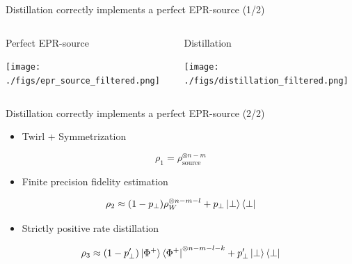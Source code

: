 \documentclass[presentation]{beamer}
\begin{document}
\begin{frame}[label={sec:org179e2c8}]{Distillation correctly implements a perfect EPR-source (1/2)}
\begin{columns}[t]
\begin{column}{.5\columnwidth}
\begin{block}{Perfect EPR-source}
\begin{center}
\texttt{[image: ./figs/epr\_source\_filtered.png]}
\end{center}
\end{block}
\end{column}
\begin{column}{.5\columnwidth}
\begin{block}{Distillation}
\begin{center}
\texttt{[image: ./figs/distillation\_filtered.png]}
\end{center}
\end{block}
\end{column}
\end{columns}
\end{frame}
\begin{frame}[label={sec:org40a4bab}]{Distillation correctly implements a perfect EPR-source (2/2)}
\begin{itemize}
\item Twirl + Symmetrization
\end{itemize}
$$\rho_1 = \rho_{\text{source}}^{\otimes n-m}$$ 
\begin{itemize}
\item Finite precision fidelity estimation
\end{itemize}
$$\rho_2 \approx (1-p_\perp) \rho_W^{\otimes n-m-l}  + p_\perp \ket{\perp}\bra{\perp}$$ 
\begin{itemize}
\item Strictly positive rate distillation
\end{itemize}
$$\rho_3 \approx (1-p_\perp') \ket{\Phi^+}\bra{\Phi^+} ^{\otimes n-m-l-k} + p_\perp' \ket{\perp}\bra{\perp}$$
\end{frame}
\end{document}
